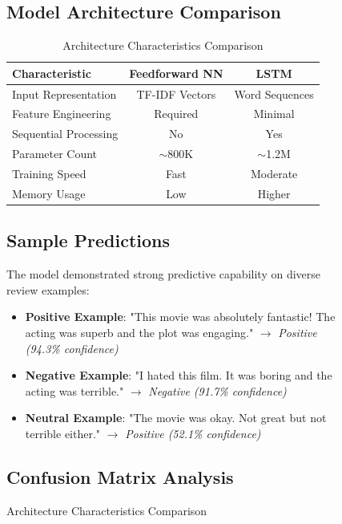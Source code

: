 \documentclass[a4paper, journal]{IEEEtran}
\begin{document}
\begin{figure}[!t]
\subsection{Model Architecture Comparison}

\begin{table}[ht]
\centering
\caption{Architecture Characteristics Comparison}

\begin{tabular}{@{}lcc@{}}
\toprule
\textbf{Characteristic} & \textbf{Feedforward NN} & \textbf{LSTM} \\
\midrule
Input Representation & TF-IDF Vectors & Word Sequences \\
Feature Engineering & Required & Minimal \\
Sequential Processing & No & Yes \\
Parameter Count & $\sim$800K & $\sim$1.2M \\
Training Speed & Fast & Moderate \\
Memory Usage & Low & Higher \\
\bottomrule
\end{tabular}
\label{tab:architecture_comparison}
\end{table}

\subsection{Sample Predictions}

The model demonstrated strong predictive capability on diverse review examples:

\begin{itemize}
    \item \textbf{Positive Example}: "This movie was absolutely fantastic! The acting was superb and the plot was engaging." $\rightarrow$ \textit{Positive (94.3\% confidence)}
    \item \textbf{Negative Example}: "I hated this film. It was boring and the acting was terrible." $\rightarrow$ \textit{Negative (91.7\% confidence)}
    \item \textbf{Neutral Example}: "The movie was okay. Not great but not terrible either." $\rightarrow$ \textit{Positive (52.1\% confidence)}
\end{itemize}

\subsection{Confusion Matrix Analysis}


\end{figure}
\end{document}
